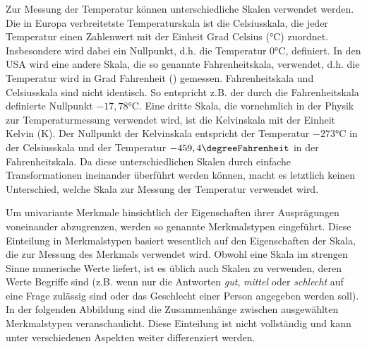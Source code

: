 \documentclass{lecture}
\begin{document}
    \begin{example}
        Zur Messung der Temperatur können unterschiedliche Skalen verwendet werden.
        Die in Europa verbreitetste Temperaturskala ist die Celsiusskala, die jeder Temperatur einen Zahlenwert mit der Einheit Grad Celsius (\si{\degreeCelsius}) zuordnet.
        Insbesondere wird dabei ein Nullpunkt, d.h. die Temperatur \(0\si{\degreeCelsius}\), definiert.
        In den USA wird eine andere Skala, die so genannte Fahrenheitskala, verwendet, d.h. die Temperatur wird in Grad Fahrenheit (\si{\degreeFahrenheit}) gemessen.
        Fahrenheitskala und Celsiusskala sind nicht identisch.
        So entspricht z.B. der durch die Fahrenheitskala definierte Nullpunkt \(-17,78\si{\degreeCelsius}\).
        Eine dritte Skala, die vornehmlich in der Physik zur Temperaturmessung verwendet wird, ist die Kelvinskala mit der Einheit Kelvin (\si{\kelvin}).
        Der Nullpunkt der Kelvinskala entspricht der Temperatur \(-273\si{\degreeCelsius}\) in der Celsiusskala und der Temperatur \(-459,4\si{\degreeFahrenheit}\) in der Fahrenheitskala.
        Da diese unterschiedlichen Skalen durch einfache Transformationen ineinander überführt werden können, macht es letztlich keinen Unterschied, welche Skala zur Messung der Temperatur verwendet wird.
    \end{example}

    Um univariante Merkmale hinsichtlich der Eigenschaften ihrer Ausprägungen voneinander abzugrenzen, werden so genannte Merkmalstypen eingeführt.
    Diese Einteilung in Merkmalstypen basiert wesentlich auf den Eigenschaften der Skala, die zur Messung des Merkmals verwendet wird.
    Obwohl eine Skala im strengen Sinne numerische Werte liefert, ist es üblich auch Skalen zu verwenden, deren Werte Begriffe sind (z.B. wenn nur die Antworten \emph{gut}, \emph{mittel} oder \emph{schlecht} auf eine Frage zulässig sind oder das Geschlecht einer Person angegeben werden soll).
    In der folgenden Abbildung sind die Zusammenhänge zwischen ausgewählten Merkmalstypen veranschaulicht.
    Diese Einteilung ist nicht vollständig und kann unter verschiedenen Aspekten weiter differenziert werden.
    \begin{center}
    \end{center}
\end{document}
